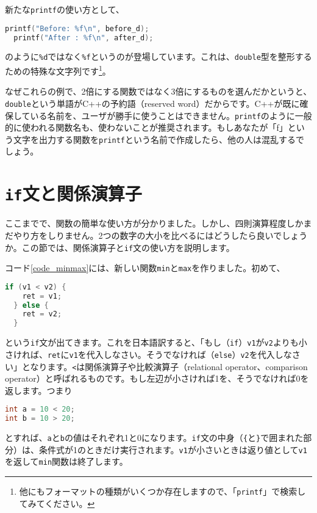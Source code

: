 新たな\texttt{printf}の使い方として、
\begin{lstlisting}[language=c++]
  printf("Before: %f\n", before_d); 
  printf("After : %f\n", after_d); 
\end{lstlisting} 
のように\texttt{\%d}ではなく\texttt{\%f}というのが登場しています。これは、\texttt{double}型を整形するための特殊な文字列です\footnote{他にもフォーマットの種類がいくつか存在しますので、「\texttt{printf}」で検索してみてください。}。

なぜこれらの例で、2倍にする関数ではなく3倍にするものを選んだかというと、\texttt{double}という単語がC++の予約語（reserved word）だからです。C++が既に確保している名前を、ユーザが勝手に使うことはできません。\texttt{printf}のように一般的に使われる関数名も、使わないことが推奨されます。もしあなたが「f」という文字を出力する関数を\texttt{printf}という名前で作成したら、他の人は混乱するでしょう。

\section{\texttt{if}文と関係演算子}

ここまでで、関数の簡単な使い方が分かりました。しかし、四則演算程度しかまだやり方をしりません。2つの数字の大小を比べるにはどうしたら良いでしょうか。この節では、関係演算子と\texttt{if}文の使い方を説明します。



コード\ref{code_minmax}には、新しい関数\texttt{min}と\texttt{max}を作りました。初めて、
\begin{lstlisting}[language=c++]
  if (v1 < v2) {
    ret = v1;
  } else {
    ret = v2;
  }
\end{lstlisting}
という\texttt{if}文が出てきます。これを日本語訳すると、「もし（\texttt{if}）\texttt{v1}が\texttt{v2}よりも小さければ、\texttt{ret}に\texttt{v1}を代入しなさい。そうでなければ（\texttt{else}）\texttt{v2}を代入しなさい」となります。\texttt{<}は関係演算子や比較演算子（relational operator、comparison operator）と呼ばれるものです。もし左辺が小さければ1を、そうでなければ0を返します。つまり
\begin{lstlisting}[language=c++]
int a = 10 < 20;
int b = 10 > 20;
\end{lstlisting}
とすれば、\texttt{a}と\texttt{b}の値はそれぞれ1と0になります。\texttt{if}文の中身（\texttt{\{}と\texttt{\}}で囲まれた部分）は、条件式が1のときだけ実行されます。\texttt{v1}が小さいときは返り値として\texttt{v1}を返して\texttt{min}関数は終了します。

